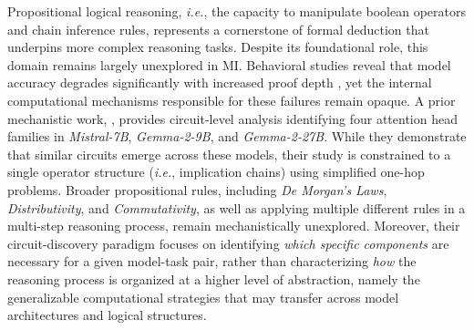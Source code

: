 \documentclass[11pt]{article}
\begin{document}
Propositional logical reasoning, \textit{i.e.}, the capacity to manipulate boolean operators and chain inference rules, represents a cornerstone of formal deduction that underpins more complex reasoning tasks. Despite its foundational role, this domain remains largely unexplored in MI. Behavioral studies reveal that model accuracy degrades significantly with increased proof depth \citep{saparov2023languagemodelsgreedy, dziri2023faithfatelimitstransformers}, yet the internal computational mechanisms responsible for these failures remain opaque. A prior mechanistic work, \citet{aimpliesb}, provides circuit-level analysis identifying four attention head families in \textit{Mistral-7B}, \textit{Gemma-2-9B}, and \textit{Gemma-2-27B}. While they demonstrate that similar circuits emerge across these models, their study is constrained to a single operator structure (\textit{i.e.}, implication chains) using simplified one-hop problems. Broader propositional rules, including \textit{De Morgan's Laws}, \textit{Distributivity}, and \textit{Commutativity}, as well as applying multiple different rules in a multi-step reasoning process, remain mechanistically unexplored. Moreover, their circuit-discovery paradigm focuses on identifying \textit{which specific components} are necessary for a given model-task pair, rather than characterizing \textit{how} the reasoning process is organized at a higher level of abstraction, namely the generalizable computational strategies that may transfer across model architectures and logical structures.
\end{document}
